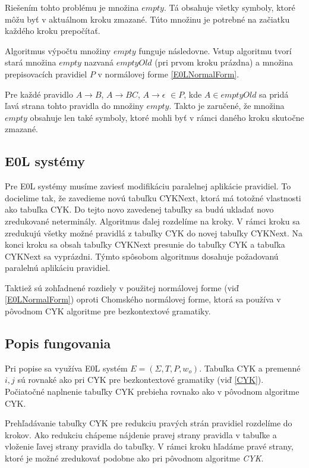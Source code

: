 Riešením tohto problému je množina $empty$. Tá obsahuje všetky symboly, ktoré môžu byť v aktuálnom kroku zmazané. Túto množinu je potrebné na začiatku každého kroku prepočítať.

Algoritmus výpočtu množiny $empty$ funguje následovne. Vstup algoritmu tvorí stará množina $empty$ nazvaná $emptyOld$ (pri prvom kroku prázdna) a množina prepisovacích pravidiel $P$ v normálovej forme \ref{E0LNormalForm}.

Pre každé pravidlo $A \to B$, $A \to BC$, $A \to \epsilon$ $\in P$, kde $A \in emptyOld$ sa pridá ľavá strana tohto pravidla do množiny $empty$. Takto je zaručené, že množina $empty$ obsahuje len také symboly, ktoré mohli byť v rámci daného kroku skutočne zmazané.


\subsection*{E0L systémy}
\label{EOL parsing}
Pre E0L systémy musíme zaviesť modifikáciu paralelnej aplikácie pravidiel. To docielime tak, že zavedieme novú tabuľku CYKNext, ktorá má totožné vlastnosti ako tabuľka CYK. Do tejto novo zavedenej tabuľky sa budú ukladať novo zredukované neterminály. Algoritmus ďalej rozdelíme na kroky. V rámci kroku sa zredukujú všetky možné pravidlá z tabuľky CYK do novej tabuľky CYKNext. Na konci kroku sa obsah tabuľky CYKNext presunie do tabuľky CYK a tabuľka CYKNext sa vyprázdni. Týmto spôsobom algoritmus dosahuje požadovanú paralelnú aplikáciu pravidiel.

Taktiež sú zohľadnené rozdiely v použitej normálovej forme (viď \ref{E0LNormalForm}) oproti Chomského normálovej forme, ktorá sa používa v pôvodnom CYK algoritme pre bezkontextové gramatiky.


\subsection*{Popis fungovania}
Pri popise sa využíva E0L systém $E = (\Sigma, T, P, w_o)$. Tabuľka CYK a premenné $i, j$ sú rovnaké ako pri CYK pre bezkontextové gramatiky (viď \ref{CYK}). Počiatočné naplnenie tabuľky CYK prebieha rovnako ako v pôvodnom algoritme CYK. 

Prehľadávanie tabuľky CYK pre redukciu pravých strán pravidiel rozdelíme do krokov. Ako redukciu chápeme nájdenie pravej strany pravidla v tabuľke a vloženie ľavej strany pravidla do tabuľky. V rámci kroku hľadáme pravé strany, ktoré je možné zredukovať podobne ako pri pôvodnom algoritme \textit{CYK}.

